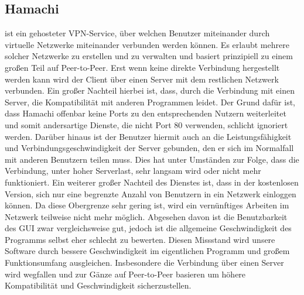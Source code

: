 \documentclass[a4paper,12pt]{scrreprt}
\begin{document}
	\subsection{Hamachi} ist ein gehosteter VPN-Service, über welchen Benutzer miteinander durch virtuelle Netzwerke miteinander verbunden werden können. Es erlaubt mehrere solcher Netzwerke zu erstellen und zu verwalten und basiert prinzipiell zu einem großen Teil auf Peer-to-Peer. Erst wenn keine direkte Verbindung hergestellt werden kann wird der Client über einen Server mit dem restlichen Netzwerk verbunden. Ein großer Nachteil hierbei ist, dass, durch die Verbindung mit einen Server, die Kompatibilität mit anderen Programmen leidet. Der Grund dafür ist, dass Hamachi offenbar keine Ports zu den entsprechenden Nutzern weiterleitet und somit andersartige Dienste, die nicht Port 80 verwenden, schlicht ignoriert werden. Darüber hinaus ist der Benutzer hiermit auch an die Leistungsfähigkeit und Verbindungsgeschwindigkeit der Server gebunden, den er sich im Normalfall mit anderen Benutzern teilen muss. Dies hat unter Umständen zur Folge, dass die Verbindung, unter hoher Serverlast, sehr langsam wird oder nicht mehr funktioniert. Ein weiterer großer Nachteil des Dienstes ist, dass in der kostenlosen Version, sich nur eine begrenzte Anzahl von Benutzern in ein Netzwerk einloggen können. Da diese Obergrenze sehr gering ist, wird ein vernünftiges Arbeiten im Netzwerk teilweise nicht mehr möglich. Abgesehen davon ist die Benutzbarkeit des GUI zwar vergleichsweise gut, jedoch ist die allgemeine Geschwindigkeit des Programms selbst eher schlecht zu bewerten. Diesen Missstand wird unsere Software durch bessere Geschwindigkeit im eigentlichen Programm und großem Funktionsumfang ausgleichen. Insbesondere die Verbindung über einen Server wird wegfallen und zur Gänze auf Peer-to-Peer basieren um höhere Kompatibilität und Geschwindigkeit sicherzustellen.
	
\end{document}
